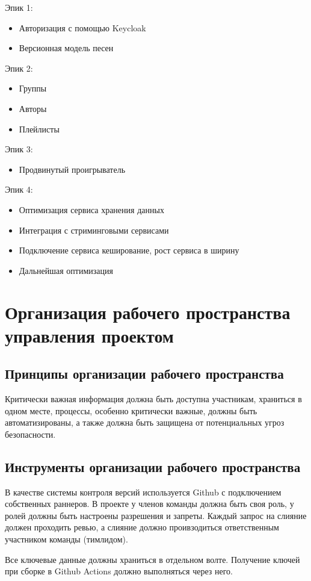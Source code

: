 \documentclass[a4paper,14pt]{extarticle}
\begin{document}
Эпик 1:
\begin{itemize}
\item Авторизация с помощью Keycloak
\item Версионная модель песен
\end{itemize}
Эпик 2:
\begin{itemize}
\item Группы
\item Авторы
\item Плейлисты
\end{itemize}
Эпик 3:
\begin{itemize}
\item Продвинутый проигрыватель
\end{itemize}
Эпик 4:
\begin{itemize}
\item Оптимизация сервиса хранения данных
\item Интеграция с стриминговыми сервисами
\item Подключение сервиса кеширование, рост сервиса в ширину
\item Дальнейшая оптимизация
\end{itemize}

\section{Организация рабочего пространства управления проектом}
\subsection{Принципы организации рабочего пространства}
Критически важная информация должна быть доступна участникам, храниться в одном месте, 
процессы, особенно критически важные, должны быть автоматизированы,
а также должна быть защищена от потенциальных угроз безопасности. 

\subsection{Инструменты организации рабочего пространства}
В качестве системы контроля версий используется Github с подключением 
собственных раннеров. В проекте у членов команды должна быть своя роль, 
у ролей должны быть настроены разрешения и запреты. Каждый запрос на слияние
должен проходить ревью, а слияние должно проивзодиться ответственным участником команды
(тимлидом). 

Все ключевые данные должны храниться в отдельном волте. Получение ключей при сборке в 
Github Actions должно выполняться через него. 
\end{document}
